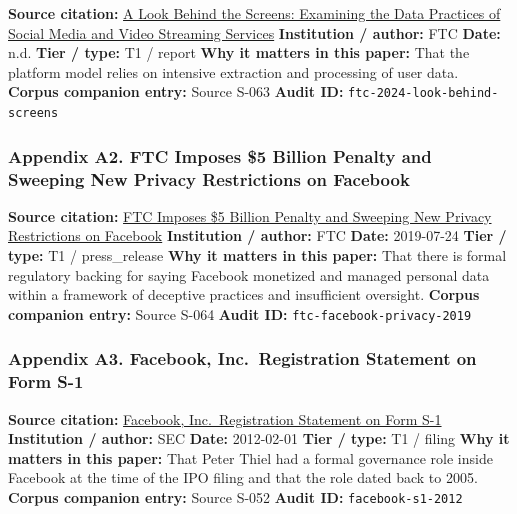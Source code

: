 \documentclass[
  american,
  11pt,
  letterpaper,
]{article}
\begin{document}
\textbf{Source citation:}
\href{https://www.ftc.gov/reports/look-behind-screens-examining-data-practices-social-media-video-streaming-services}{A
Look Behind the Screens: Examining the Data Practices of Social Media
and Video Streaming Services} \textbf{Institution / author:} FTC
\textbf{Date:} n.d. \textbf{Tier / type:} T1 / report \textbf{Why it
matters in this paper:} That the platform model relies on intensive
extraction and processing of user data. \textbf{Corpus companion entry:}
Source S-063 \textbf{Audit ID:} \texttt{ftc-2024-look-behind-screens}

\subsubsection{Appendix A2. FTC Imposes \$5 Billion Penalty and Sweeping
New Privacy Restrictions on
Facebook}\label{ch-01-appendix-a2-ftc-imposes-5-billion-penalty-and-sweeping-new-privacy-restrictions-on-facebook}

\textbf{Source citation:}
\href{https://www.ftc.gov/news-events/news/press-releases/2019/07/ftc-imposes-5-billion-penalty-sweeping-new-privacy-restrictions-facebook}{FTC
Imposes \$5 Billion Penalty and Sweeping New Privacy Restrictions on
Facebook} \textbf{Institution / author:} FTC \textbf{Date:} 2019-07-24
\textbf{Tier / type:} T1 / press\_release \textbf{Why it matters in this
paper:} That there is formal regulatory backing for saying Facebook
monetized and managed personal data within a framework of deceptive
practices and insufficient oversight. \textbf{Corpus companion entry:}
Source S-064 \textbf{Audit ID:} \texttt{ftc-facebook-privacy-2019}

\subsubsection{Appendix A3. Facebook, Inc.~Registration Statement on
Form
S-1}\label{ch-01-appendix-a3-facebook-inc-registration-statement-on-form-s-1}

\textbf{Source citation:}
\href{https://www.sec.gov/Archives/edgar/data/1326801/000119312512034517/d287954ds1.htm}{Facebook,
Inc.~Registration Statement on Form S-1} \textbf{Institution / author:}
SEC \textbf{Date:} 2012-02-01 \textbf{Tier / type:} T1 / filing
\textbf{Why it matters in this paper:} That Peter Thiel had a formal
governance role inside Facebook at the time of the IPO filing and that
the role dated back to 2005. \textbf{Corpus companion entry:} Source
S-052 \textbf{Audit ID:} \texttt{facebook-s1-2012}
\end{document}
